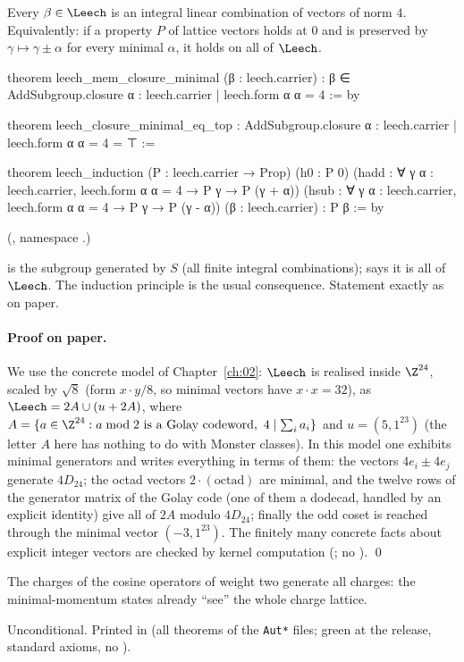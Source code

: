 \begin{theorem}\label{ch20:thm:leechspan}
Every $\beta\in\Leech$ is an integral linear combination of vectors of norm $4$.  Equivalently: if a property $P$ of
lattice vectors holds at $0$ and is preserved by $\gamma\mapsto\gamma\pm\alpha$ for every minimal $\alpha$, it holds on
all of $\Leech$.
\end{theorem}
\begin{leancode}
theorem leech_mem_closure_minimal (β : leech.carrier) :
    β ∈ AddSubgroup.closure {α : leech.carrier | leech.form α α = 4} := by

theorem leech_closure_minimal_eq_top :
    AddSubgroup.closure {α : leech.carrier | leech.form α α = 4} = ⊤ :=

theorem leech_induction (P : leech.carrier → Prop) (h0 : P 0)
    (hadd : ∀ γ α : leech.carrier, leech.form α α = 4 → P γ → P (γ + α))
    (hsub : ∀ γ α : leech.carrier, leech.form α α = 4 → P γ → P (γ - α))
    (β : leech.carrier) : P β := by
\end{leancode}
(, namespace .)
\begin{dictionary}
 is the subgroup generated by $S$ (all finite integral combinations);  says it is
all of $\Leech$.  The induction principle is the usual consequence.  Statement exactly as on paper.
\end{dictionary}
\paragraph{Proof on paper.}  We use the concrete model of Chapter~\ref{ch:02}: $\Leech$ is realised inside $\Z^{24}$, scaled
by $\sqrt8$ (form $x\cdot y/8$, so minimal vectors have $x\cdot x=32$), as $\Leech=2A\cup(u+2A)$, where
$A=\{a\in\Z^{24}: a\bmod2\text{ is a Golay codeword},\ 4\mid\sum_ia_i\}$ and $u=(5,1^{23})$ (the letter $A$ here has nothing to do
with Monster classes).  In this model one exhibits minimal generators and writes everything in terms of them:
the vectors $4e_i\pm4e_j$ generate $4D_{24}$; the octad vectors $2\cdot(\text{octad})$ are minimal, and the twelve
rows of the generator matrix of the Golay code (one of them a dodecad, handled by an explicit identity) give all of
$2A$ modulo $4D_{24}$; finally the odd coset is reached through the minimal vector $(-3,1^{23})$.  The finitely many
concrete facts about explicit integer vectors are checked by kernel computation (; no
). \qed
\begin{physics}
The charges of the cosine operators of weight two generate all charges: the minimal-momentum states already ``see''
the whole charge lattice.
\end{physics}
\begin{status}
Unconditional.  Printed in  (all theorems of the \texttt{Aut*} files; green at the release, standard axioms, no ).
\end{status}

